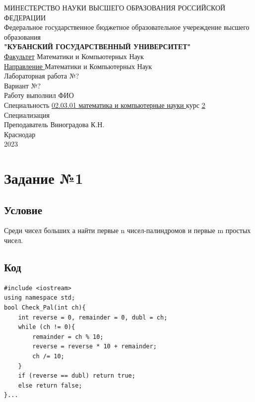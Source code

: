 \documentclass[a4paper]{article}
\begin{document}
\begin{center}
\hfill \break
{\large МИНЕСТЕРСТВО НАУКИ ВЫСШЕГО ОБРАЗОВАНИЯ РОССИЙСКОЙ ФЕДЕРАЦИИ}\\
{\large Федеральное государственное бюджетное образовательное учереждение высшего образования}\\
\hfill \break
{\large \textbf{"КУБАНСКИЙ ГОСУДАРСТВЕННЫЙ УНИВЕРСИТЕТ"}} \\
\hfill \break
{\large \underline {Факультет}}\: Математики и Компьютерных Наук\\
{\large \underline {Направление }}\: Математики и Компьютерных Наук\\

\hfill \break
\hfill \break
\hfill \break
{\Large Лабораторная работа №?}\\
{\Large Вариант  №?}\\
\hfill \break \hfill \break
\hfill \break \hfill \break
Работу выполнил \underline{\hspace{7cm}} ФИО\\
\hfill \break
Специальность \underline{02.03.01 математика и компьютерные науки } курс \underline{ 2}\\
\hfill \break
Специализация \underline{\hspace{11cm}}\\
\hfill \break
Преподаватель \underline{\hspace{6cm}} Виноградова К.Н.\\
\hfill \break
\hfill \break 
\hfill \break \hfill \break
Краснодар\\
2023
\end{center}
\thispagestyle{empty}
\newpage
\begin{center}
\tableofcontents
\end{center}
\newpage
\section{Задание №1} 
\subsection{Условие}
Среди чисел больших а найти первые n чисел-палиндромов и первые m простых чисел.
\subsection{Код}
\scriptsize
\begin{verbatim}
#include <iostream>
using namespace std;
bool Check_Pal(int ch){
    int reverse = 0, remainder = 0, dubl = ch;
    while (ch != 0){
        remainder = ch % 10;
        reverse = reverse * 10 + remainder;
        ch /= 10;
    }
    if (reverse == dubl) return true;
    else return false;
}...
\end{verbatim}\normalsize
\end{document}
